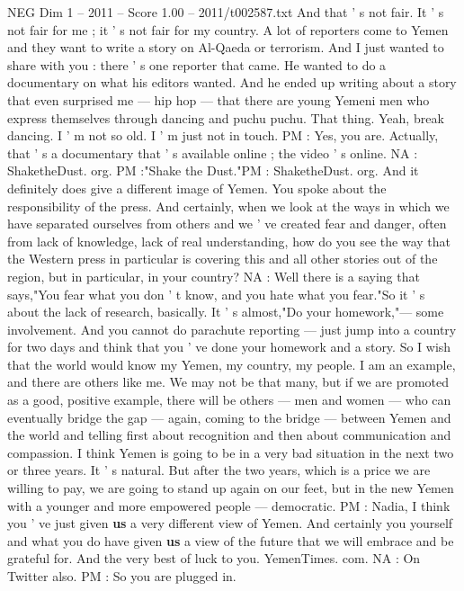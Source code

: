 \begin{textsample}{NEG Dim 1 – 2011 – Score 1.00 – 2011/t002587.txt}
And that ' s not fair.
It ' s not fair for me ; it ' s not fair for my country.
A lot of reporters come to Yemen and they want to write a story on Al-Qaeda or terrorism.
And I just wanted to share with you : there ' s one reporter that came.
He wanted to do a documentary on what his editors wanted.
And he ended up writing about a story that even surprised me — hip hop — that there are young Yemeni men who express themselves through dancing and puchu puchu.
That thing.
Yeah, break dancing.
I ' m not so old.
I ' m just not in touch.
PM : Yes, you are.
Actually, that ' s a documentary that ' s available online ; the video ' s online.
NA : ShaketheDust. org.
PM :"Shake the Dust."PM : ShaketheDust. org.
And it definitely does give a different image of Yemen.
You spoke about the responsibility of the press.
And certainly, when we look at the ways in which we have separated ourselves from others and we ' ve created fear and danger, often from lack of knowledge, lack of real understanding, how do you see the way that the Western press in particular is covering this and all other stories out of the region, but in particular, in your country?
NA : Well there is a saying that says,"You fear what you don ' t know, and you hate what you fear."So it ' s about the lack of research, basically.
It ' s almost,"Do your homework,"— some involvement.
And you cannot do parachute reporting — just jump into a country for two days and think that you ' ve done your homework and a story.
So I wish that the world would know my Yemen, my country, my people.
I am an example, and there are others like me.
We may not be that many, but if we are promoted as a good, positive example, there will be others — men and women — who can eventually bridge the gap — again, coming to the bridge — between Yemen and the world and telling first about recognition and then about communication and compassion.
I think Yemen is going to be in a very bad situation in the next two or three years.
It ' s natural.
But after the two years, which is a price we are willing to pay, we are going to stand up again on our feet, but in the new Yemen with a younger and more empowered people — democratic.
PM : Nadia, I think you ' ve just given \textbf{us} a very different view of Yemen.
And certainly you yourself and what you do have given \textbf{us} a view of the future that we will embrace and be grateful for.
And the very best of luck to you.
YemenTimes. com.
NA : On Twitter also.
PM : So you are plugged in.

\end{textsample}
